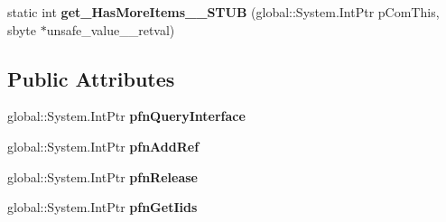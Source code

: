 \begin{DoxyCompactItemize}
\item 
\mbox{\label{struct_windows_1_1_u_i_1_1_xaml_1_1_data_1_1_i_support_incremental_loading_____impl_1_1_vtbl_ae881f5715c03ffea730fd44d74b4735e}} 
static int {\bfseries get\+\_\+\+Has\+More\+Items\+\_\+\+\_\+\+S\+T\+UB} (global\+::\+System.\+Int\+Ptr p\+Com\+This, sbyte $\ast$unsafe\+\_\+value\+\_\+\+\_\+retval)
\end{DoxyCompactItemize}
\subsection*{Public Attributes}
\begin{DoxyCompactItemize}
\item 
\mbox{\label{struct_windows_1_1_u_i_1_1_xaml_1_1_data_1_1_i_support_incremental_loading_____impl_1_1_vtbl_a83245fd488818119b07620b6779c63f2}} 
global\+::\+System.\+Int\+Ptr {\bfseries pfn\+Query\+Interface}
\item 
\mbox{\label{struct_windows_1_1_u_i_1_1_xaml_1_1_data_1_1_i_support_incremental_loading_____impl_1_1_vtbl_ac391bd7e46ded766b0ef3d82f44740e1}} 
global\+::\+System.\+Int\+Ptr {\bfseries pfn\+Add\+Ref}
\item 
\mbox{\label{struct_windows_1_1_u_i_1_1_xaml_1_1_data_1_1_i_support_incremental_loading_____impl_1_1_vtbl_af1c7697fb376136a9ea50caef3336612}} 
global\+::\+System.\+Int\+Ptr {\bfseries pfn\+Release}
\item 
\mbox{\label{struct_windows_1_1_u_i_1_1_xaml_1_1_data_1_1_i_support_incremental_loading_____impl_1_1_vtbl_a2b4f38ca0150ed7008ac3c0bae890093}} 
global\+::\+System.\+Int\+Ptr {\bfseries pfn\+Get\+Iids}
\item 
\mbox{\label{struct_windows_1_1_u_i_1_1_xaml_1_1_data_1_1_i_support_incremental_loading_____impl_1_1_vtbl_a575db8d2403d3d48ca88d2492ec7ecc3}} 

\end{DoxyCompactItemize}
